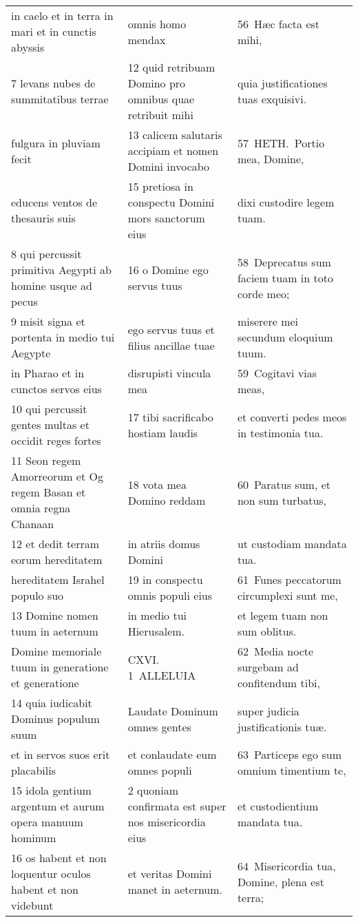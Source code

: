 \documentclass{article}
\begin{document}
\begin{longtable}{@{}p{}p{}p{}@{}}
in caelo et in terra in mari et in cunctis abyssis	&	omnis homo mendax	&	56 Hæc facta est mihi,	\\
7 levans nubes de summitatibus terrae	&	12 quid retribuam Domino pro omnibus quae retribuit mihi	&	quia justificationes tuas exquisivi.	\\
fulgura in pluviam fecit	&	13 calicem salutaris accipiam et nomen Domini invocabo	&	57 HETH. Portio mea, Domine,	\\
educens ventos de thesauris suis	&	15 pretiosa in conspectu Domini mors sanctorum eius	&	dixi custodire legem tuam.	\\
8 qui percussit primitiva Aegypti ab homine usque ad pecus	&	16 o Domine ego servus tuus	&	58 Deprecatus sum faciem tuam in toto corde meo;	\\
9 misit signa et portenta in medio tui Aegypte	&	ego servus tuus et filius ancillae tuae	&	miserere mei secundum eloquium tuum.	\\
in Pharao et in cunctos servos eius	&	disrupisti vincula mea	&	59 Cogitavi vias meas,	\\
10 qui percussit gentes multas et occidit reges fortes	&	17 tibi sacrificabo hostiam laudis	&	et converti pedes meos in testimonia tua.	\\
11 Seon regem Amorreorum et Og regem Basan et omnia regna Chanaan	&	18 vota mea Domino reddam	&	60 Paratus sum, et non sum turbatus,	\\
12 et dedit terram eorum hereditatem	&	in atriis domus Domini	&	ut custodiam mandata tua.	\\
hereditatem Israhel populo suo	&	19 in conspectu omnis populi eius	&	61 Funes peccatorum circumplexi sunt me,	\\
13 Domine nomen tuum in aeternum	&	in medio tui Hierusalem.	&	et legem tuam non sum oblitus.	\\
Domine memoriale tuum in generatione et generatione	&	CXVI. 1 ALLELUIA	&	62 Media nocte surgebam ad confitendum tibi,	\\
14 quia iudicabit Dominus populum suum	&	Laudate Dominum omnes gentes	&	super judicia justificationis tuæ.	\\
et in servos suos erit placabilis	&	et conlaudate eum omnes populi	&	63 Particeps ego sum omnium timentium te,	\\
15 idola gentium argentum et aurum opera manuum hominum	&	2 quoniam confirmata est super nos misericordia eius	&	et custodientium mandata tua.	\\
16 os habent et non loquentur oculos habent et non videbunt	&	et veritas Domini manet in aeternum.	&	64 Misericordia tua, Domine, plena est terra;	\\

\end{longtable}
\end{document}
